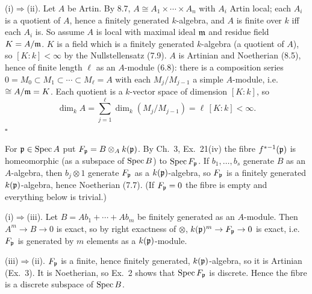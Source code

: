 \documentclass[11pt]{article}
\begin{document}
(i)$\Rightarrow$(ii). Let $A$ be Artin. By 8.7, $A\cong A_1\times\cdots\times A_n$ with $A_i$ Artin local; each $A_i$ is a quotient of $A$, hence a finitely generated $k$-algebra, and $A$ is finite over $k$ iff each $A_i$ is. So assume $A$ is local with maximal ideal $\mathfrak m$ and residue field $K=A/\mathfrak m$. $K$ is a field which is a finitely generated $k$-algebra (a quotient of $A$), so $[K:k]<\infty$ by the Nullstellensatz (7.9). $A$ is Artinian and Noetherian (8.5), hence of finite length $\ell$ as an $A$-module (6.8): there is a composition series $0=M_0\subset M_1\subset\cdots\subset M_\ell=A$ with each $M_j/M_{j-1}$ a simple $A$-module, i.e.\ $\cong A/\mathfrak m=K$. Each quotient is a $k$-vector space of dimension $[K:k]$, so
\[
\dim_kA=\sum_{j=1}^\ell\dim_k(M_j/M_{j-1})=\ell\,[K:k]<\infty .
\]
\hfill$\square$

\pf
For $\mathfrak p\in\operatorname{Spec} A$ put $F_\mathfrak p=B\otimes_Ak(\mathfrak p)$. By Ch.~3, Ex.~21(iv) the fibre $f^{*-1}(\mathfrak p)$ is homeomorphic (as a subspace of $\operatorname{Spec} B$) to $\operatorname{Spec} F_\mathfrak p$. If $b_1,\dots,b_s$ generate $B$ as an $A$-algebra, then $b_j\otimes1$ generate $F_\mathfrak p$ as a $k(\mathfrak p)$-algebra, so $F_\mathfrak p$ is a finitely generated $k(\mathfrak p)$-algebra, hence Noetherian (7.7). (If $F_\mathfrak p=0$ the fibre is empty and everything below is trivial.)

(i)$\Rightarrow$(iii). Let $B=Ab_1+\cdots+Ab_m$ be finitely generated as an $A$-module. Then $A^m\to B\to0$ is exact, so by right exactness of $\otimes$, $k(\mathfrak p)^m\to F_\mathfrak p\to0$ is exact, i.e.\ $F_\mathfrak p$ is generated by $m$ elements as a $k(\mathfrak p)$-module.

(iii)$\Rightarrow$(ii). $F_\mathfrak p$ is a finite, hence finitely generated, $k(\mathfrak p)$-algebra, so it is Artinian (Ex.~3). It is Noetherian, so Ex.~2 shows that $\operatorname{Spec} F_\mathfrak p$ is discrete. Hence the fibre is a discrete subspace of $\operatorname{Spec} B$.
\end{document}
